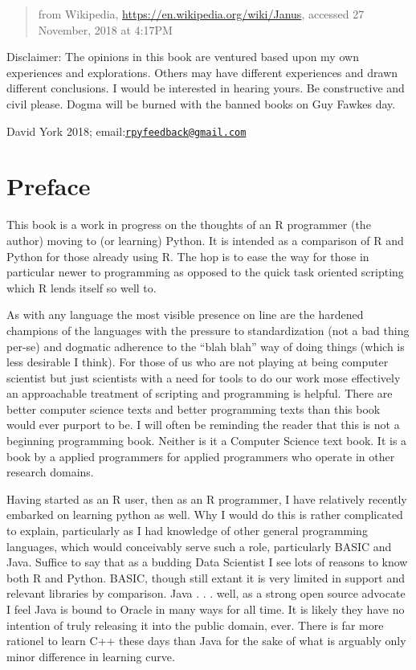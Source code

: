 \documentclass[]{book}
\theoremstyle{definition}
\theoremstyle{definition}
\theoremstyle{definition}
\theoremstyle{remark}
\begin{document}
\begin{quote}
from Wikipedia, \url{https://en.wikipedia.org/wiki/Janus}, accessed 27
November, 2018 at 4:17PM
\end{quote}

Disclaimer: The opinions in this book are ventured based upon my own
experiences and explorations. Others may have different experiences and
drawn different conclusions. I would be interested in hearing yours. Be
constructive and civil please. Dogma will be burned with the banned
books on Guy Fawkes day.

David York 2018;
email:\href{mailto:rpyfeedback@gmail.com}{\nolinkurl{rpyfeedback@gmail.com}}

\section{Preface}\label{preface}

This book is a work in progress on the thoughts of an R programmer (the
author) moving to (or learning) Python. It is intended as a comparison
of R and Python for those already using R. The hop is to ease the way
for those in particular newer to programming as opposed to the quick
task oriented scripting which R lends itself so well to.

As with any language the most visible presence on line are the hardened
champions of the languages with the pressure to standardization (not a
bad thing per-se) and dogmatic adherence to the ``blah blah'' way of
doing things (which is less desirable I think). For those of us who are
not playing at being computer scientist but just scientists with a need
for tools to do our work mose effectively an approachable treatment of
scripting and programming is helpful. There are better computer science
texts and better programming texts than this book would ever purport to
be. I will often be reminding the reader that this is not a beginning
programming book. Neither is it a Computer Science text book. It is a
book by a applied programmers for applied programmers who operate in
other research domains.

Having started as an R user, then as an R programmer, I have relatively
recently embarked on learning python as well. Why I would do this is
rather complicated to explain, particularly as I had knowledge of other
general programming languages, which would conceivably serve such a
role, particularly BASIC and Java. Suffice to say that as a budding Data
Scientist I see lots of reasons to know both R and Python. BASIC, though
still extant it is very limited in support and relevant libraries by
comparison. Java . . . well, as a strong open source advocate I feel
Java is bound to Oracle in many ways for all time. It is likely they
have no intention of truly releasing it into the public domain, ever.
There is far more rationel to learn C++ these days than Java for the
sake of what is arguably only minor difference in learning curve.
\end{document}
